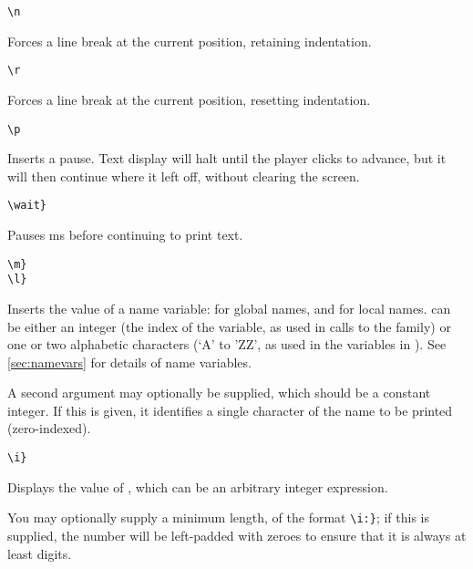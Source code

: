     \lstinline|\n|
    \begin{cmdesc}
      Forces a line break at the current position, retaining indentation.
    \end{cmdesc}
    \lstinline|\r|
    \begin{cmdesc}
      Forces a line break at the current position, resetting indentation.
    \end{cmdesc}
    \lstinline|\p|
    \begin{cmdesc}
      Inserts a pause.  Text display will halt until the player clicks to
      advance, but it will then continue where it left off, without clearing the
      screen.
    \end{cmdesc}
    \lstinline|\wait|\rawlbrace{}\lstinline|}|
    \begin{cmdesc}
      Pauses  ms before continuing to print text.
    \end{cmdesc}
    \lstinline|\m|\rawlbrace{}\lstinline|}|\\
    \lstinline|\l|\rawlbrace{}\lstinline|}|
    \begin{cmdesc}
      Inserts the value of a name variable:  for global names, and
       for local names.   can be either an integer
      (the index of the variable, as used in calls to the 
      family) or one or two alphabetic characters (`A' to 'ZZ', as used in
      the  variables in \gameexe).  See \ref{sec:namevars} for
      details of name variables.

      A second argument may optionally be supplied, which should be a constant
      integer.  If this is given, it identifies a single character of the name
      to be printed (zero-indexed).
    \end{cmdesc}
    \lstinline|\i|\rawlbrace{}\lstinline|}|
    \begin{cmdesc}
      Displays the value of , which can be an arbitrary integer
      expression.

      You may optionally supply a minimum length, of the format
      \lstinline|\i:|\rawlbrace{}\lstinline|}|; if
      this is supplied, the number will be left-padded with zeroes to ensure
      that it is always at least  digits.
    \end{cmdesc}
